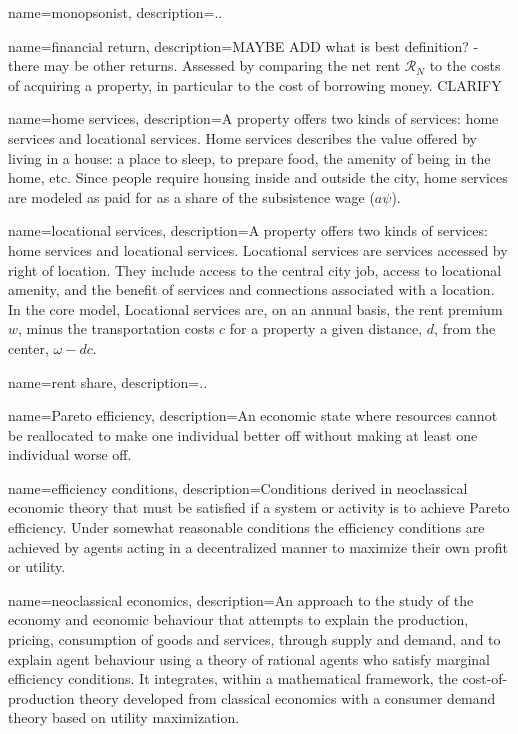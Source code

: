 {
name=monopsonist,
description={..}
}

{
name=financial return,
description={MAYBE ADD what is best definition? - there may be other returns. Assessed by comparing the net rent $\mathcal{R}_N$ to the costs of acquiring a property, in particular to the cost of borrowing money. CLARIFY}
}

{
name=home services,
description={A property offers two kinds of services: home services and \gls{locational services}. Home services describes the value offered by living in a house: a place to sleep, to prepare food, the amenity of being in the home, etc. Since people require housing inside and outside the city, home services are modeled as paid for as a share of the subsistence wage ($a \psi$).}
}

{
name=locational services,
description={A property offers two kinds of services: \gls{home services} and locational services. Locational services are services accessed by right of location. They include access to the central city job, access to locational amenity, and the benefit of services and connections associated with a location. In the core model, Locational services are, on an annual basis, the rent premium $w$, minus the transportation costs $c$ for a property a given distance, $d$, from the center, $\omega- {dc}$.}
}

{
name=rent share,
description={..}
}

{
name=Pareto efficiency,
description={An economic state where resources cannot be reallocated to make one individual better off without making at least one individual worse off.}
}

{
name=efficiency conditions,
description={Conditions derived in neoclassical economic theory that must be satisfied if a system or activity is to achieve Pareto efficiency. Under somewhat reasonable conditions the efficiency conditions are achieved by agents acting in a decentralized manner to maximize their own profit or utility.}
}

{
name=neoclassical economics,
description={An approach to the study of the economy and economic behaviour that attempts to explain the production, pricing, consumption of goods and services,  through supply and demand, and to explain agent behaviour using a theory of rational agents who satisfy \gls{marginal} efficiency conditions. It integrates, within a mathematical framework, the cost-of-production theory  developed from \gls{classical economics} with a consumer demand theory based on utility maximization.}
}

